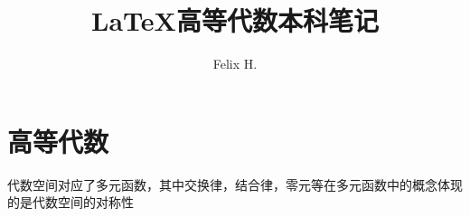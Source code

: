 \documentclass{MathNoteCN}
\title{ \LaTeX 高等代数本科笔记}
\author{Felix H.}
\begin{document}
\maketitle
\section{高等代数}
代数空间对应了多元函数，其中交换律，结合律，零元等在多元函数中的概念体现的是代数空间的对称性


\end{document}
